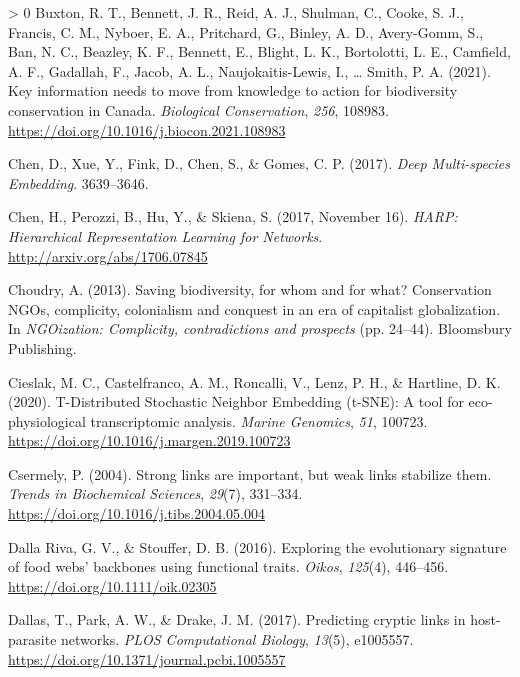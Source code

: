 \documentclass[11pt]{article}
\newlength{\cslhangindent}
\newenvironment{CSLReferences}[3] %
 {%
  \setlength{\parindent}{0pt}
  \ifodd #1 \everypar{\setlength{\hangindent}{\cslhangindent}}\ignorespaces\fi
  \ifnum #2 > 0
  \setlength{\parskip}{#2\baselineskip}
  \fi
 }%
 {}
\begin{document}
\begin{CSLReferences}{1}{0}
\leavevmode\hypertarget{ref-Buxton2021KeyInf}{}%
Buxton, R. T., Bennett, J. R., Reid, A. J., Shulman, C., Cooke, S. J.,
Francis, C. M., Nyboer, E. A., Pritchard, G., Binley, A. D., Avery-Gomm,
S., Ban, N. C., Beazley, K. F., Bennett, E., Blight, L. K., Bortolotti,
L. E., Camfield, A. F., Gadallah, F., Jacob, A. L., Naujokaitis-Lewis,
I., \ldots{} Smith, P. A. (2021). Key information needs to move from
knowledge to action for biodiversity conservation in Canada.
\emph{Biological Conservation}, \emph{256}, 108983.
\url{https://doi.org/10.1016/j.biocon.2021.108983}

\leavevmode\hypertarget{ref-Chen2017DeeMul}{}%
Chen, D., Xue, Y., Fink, D., Chen, S., \& Gomes, C. P. (2017).
\emph{Deep Multi-species Embedding}. 3639--3646.

\leavevmode\hypertarget{ref-Chen2017HarHie}{}%
Chen, H., Perozzi, B., Hu, Y., \& Skiena, S. (2017, November 16).
\emph{HARP: Hierarchical Representation Learning for Networks}.
\url{http://arxiv.org/abs/1706.07845}

\leavevmode\hypertarget{ref-Choudry2013SavBio}{}%
Choudry, A. (2013). Saving biodiversity, for whom and for what?
Conservation NGOs, complicity, colonialism and conquest in an era of
capitalist globalization. In \emph{NGOization: Complicity,
contradictions and prospects} (pp. 24--44). Bloomsbury Publishing.

\leavevmode\hypertarget{ref-Cieslak2020TdiSto}{}%
Cieslak, M. C., Castelfranco, A. M., Roncalli, V., Lenz, P. H., \&
Hartline, D. K. (2020). T-Distributed Stochastic Neighbor Embedding
(t-SNE): A tool for eco-physiological transcriptomic analysis.
\emph{Marine Genomics}, \emph{51}, 100723.
\url{https://doi.org/10.1016/j.margen.2019.100723}

\leavevmode\hypertarget{ref-Csermely2004StrLin}{}%
Csermely, P. (2004). Strong links are important, but weak links
stabilize them. \emph{Trends in Biochemical Sciences}, \emph{29}(7),
331--334. \url{https://doi.org/10.1016/j.tibs.2004.05.004}

\leavevmode\hypertarget{ref-DallaRiva2016ExpEvo}{}%
Dalla Riva, G. V., \& Stouffer, D. B. (2016). Exploring the evolutionary
signature of food webs' backbones using functional traits. \emph{Oikos},
\emph{125}(4), 446--456. \url{https://doi.org/10.1111/oik.02305}

\leavevmode\hypertarget{ref-Dallas2017PreCry}{}%
Dallas, T., Park, A. W., \& Drake, J. M. (2017). Predicting cryptic
links in host-parasite networks. \emph{PLOS Computational Biology},
\emph{13}(5), e1005557.
\url{https://doi.org/10.1371/journal.pcbi.1005557}


\end{CSLReferences}
\end{document}
